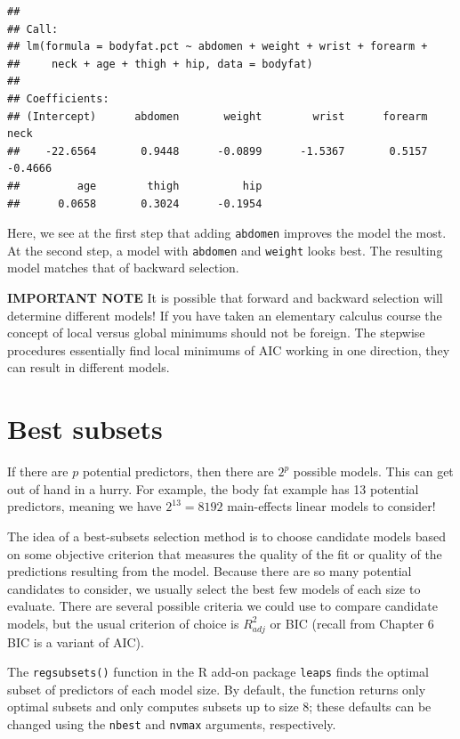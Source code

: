 \documentclass[
]{book}
\begin{document}
\begin{verbatim}
## 
## Call:
## lm(formula = bodyfat.pct ~ abdomen + weight + wrist + forearm + 
##     neck + age + thigh + hip, data = bodyfat)
## 
## Coefficients:
## (Intercept)      abdomen       weight        wrist      forearm         neck  
##    -22.6564       0.9448      -0.0899      -1.5367       0.5157      -0.4666  
##         age        thigh          hip  
##      0.0658       0.3024      -0.1954
\end{verbatim}

Here, we see at the first step that adding \texttt{abdomen} improves the model the most. At the second step, a model with \texttt{abdomen} and \texttt{weight} looks best. The resulting model matches that of backward selection.

\textbf{IMPORTANT NOTE} It is possible that forward and backward selection will determine different models! If you have taken an elementary calculus course the concept of local versus global minimums should not be foreign. The stepwise procedures essentially find local minimums of AIC working in one direction, they can result in different models.

\hypertarget{best-subsets}{%
\section{Best subsets}\label{best-subsets}}

If there are \(p\) potential predictors, then there are \(2^p\) possible models. This can get out of hand in a hurry. For example, the body fat example has 13 potential predictors, meaning we have \(2^{13} = 8192\) main-effects linear models to consider!

The idea of a best-subsets selection method is to choose candidate models based on some objective criterion that measures the quality of the fit or quality of the predictions resulting from the model. Because there are so many potential candidates to consider, we usually select the best few models of each size to evaluate. There are several possible criteria we could use to compare candidate models, but the usual criterion of choice is \(R_{adj}^2\) or BIC (recall from Chapter 6 BIC is a variant of AIC).

The \texttt{regsubsets()} function in the R add-on package \texttt{leaps} finds the optimal subset of predictors of each model size. By default, the function returns only optimal subsets and only computes subsets up to size 8; these defaults can be changed using the \texttt{nbest} and \texttt{nvmax} arguments, respectively.
\end{document}
